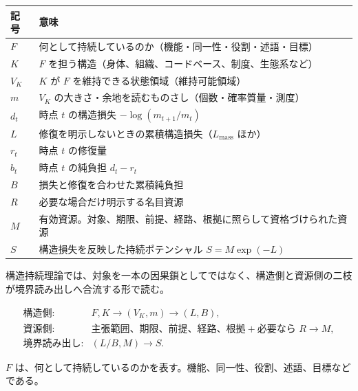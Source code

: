 \documentclass[12pt,a4paper]{article}
\begin{document}
{\def\LTcaptype{table} %
\begin{longtable}[]{@{}
  >{\raggedright\arraybackslash}p{}
  >{\raggedright\arraybackslash}p{}@{}}
\toprule\noalign{}
\begin{minipage}[b]{\linewidth}\raggedright
記号
\end{minipage} & \begin{minipage}[b]{\linewidth}\raggedright
意味
\end{minipage} \\
\midrule\noalign{}
\endhead
\bottomrule\noalign{}
\endlastfoot
\(F\) & 何として持続しているのか（機能・同一性・役割・述語・目標） \\
\(K\) & \(F\) を担う構造（身体、組織、コードベース、制度、生態系など） \\
\(V_K\) & \(K\) が \(F\) を維持できる状態領域（維持可能領域） \\
\(m\) & \(V_K\) の大きさ・余地を読むものさし（個数・確率質量・測度） \\
\(d_t\) & 時点 \(t\) の構造損失 \(-\log(m_{t+1}/m_t)\) \\
\(L\) & 修復を明示しないときの累積構造損失（\(L_{\mathrm{mass}}\) ほか） \\
\(r_t\) & 時点 \(t\) の修復量 \\
\(b_t\) & 時点 \(t\) の純負担 \(d_t-r_t\) \\
\(B\) & 損失と修復を合わせた累積純負担 \\
\(R\) & 必要な場合だけ明示する名目資源 \\
\(M\) & 有効資源。対象、期限、前提、経路、根拠に照らして資格づけられた資源 \\
\(S\) & 構造損失を反映した持続ポテンシャル \(S=M\exp(-L)\) \\
\end{longtable}
}

構造持続理論では、対象を一本の因果鎖としてではなく、構造側と資源側の二枝が境界読み出しへ合流する形で読む。

\[
\begin{array}{ll}
\text{構造側:} & F,K \to (V_K,m) \to (L,B),\\
\text{資源側:} & \text{主張範囲、期限、前提、経路、根拠}
                 + \text{必要なら }R \to M,\\
\text{境界読み出し:} & (L/B,M) \to S.
\end{array}
\]

\(F\) は、何として持続しているのかを表す。機能、同一性、役割、述語、目標などである。
\end{document}

